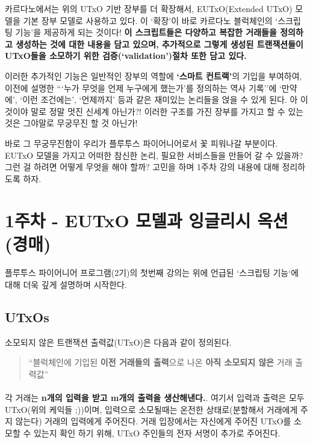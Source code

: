 \documentclass[a4paper, 11pt]{article}
\begin{document}
\begin{description}
        카르다노에서는 위의 UTxO 기반 장부를 더 확장해서, EUTxO(Extended UTxO) 모델을 기본 장부 모델로 사용하고 있다. 이 `확장'이 바로 카르다노 블럭체인의 `스크립팅 기능'을 제공하게 되는 것이다! \textbf{이 스크립트들은 다양하고 복잡한 거래들을 정의하고 생성하는 것에 대한 내용을 담고 있으며, 추가적으로 그렇게 생성된 트랜잭션들이 UTxO들을 소모하기 위한 검증(`validation')절차 또한 담고 있다.}

        이러한 추가적인 기능은 일반적인 장부의 역할에 \textbf{`스마트 컨트랙'}의 기입을 부여하여, 이전에 설명한 ```누가 무엇을 언제 누구에게 했는가'를 정의하는 역사 기록''에 `만약에', `이런 조건에는', `언제까지' 등과 같은 재미있는 논리들을 얹을 수 있게 된다. 아 이것이야 말로 정말 멋진 신세계 아닌가?! 이러한 구조를 가진 장부를 가지고 할 수 있는 것은 그야말로 무궁무진 할 것 아닌가! 

        바로 그 무궁무진함이 우리가 플루투스 파이어니어로서 꽃 피워나갈 부분이다. EUTxO 모델을 가지고 어떠한 참신한 논리, 필요한 서비스들을 만들어 갈 수 있을까? 그런 걸 하려면 어떻게 무엇을 해야 할까? 고민을 하며 1주차 강의 내용에 대해 정리하도록 하자.
    \end{description}
    
    \section{1주차 - EUTxO 모델과 잉글리시 옥션(경매)}

    \paragraph{} 플루투스 파이어니어 프로그램(2기)의 첫번째 강의는 위에 언급된 `스크립팅 기능`에 대해 더욱 깊게 설명하며 시작한다.

    \subsection{UTxOs}

    소모되지 않은 트랜잭션 출력값(UTxO)은 다음과 같이 정의된다.
    \begin{quotation}
        ``블럭체인에 기입된 \textbf{이전 거래들의 출력}으로 나온 \textbf{아직 소모되지 않은} 거래 출력값''
    \end{quotation}
    
    \paragraph{} 각 거래는 \textbf{n개의 입력을 받고 m개의 출력을 생산해낸다.}. 여기서 입력과 출력은 모두 UTxO(위의 케익들 ;))이며, 입력으로 소모될때는 온전한 상태로(분할해서 거래에게 주지 않는다) 거래의 입력에게 주어진다. 거래 입장에서는 자신에게 주어진 UTxO를 소모할 수 있는지 확인 하기 위해, UTxO 주인들의 전자 서명이 추가로 주어진다.
\end{document}
